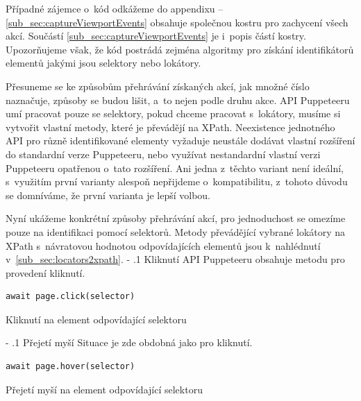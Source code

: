 \documentclass[12pt, a4paper, twoside]{article}
\makeatletter
\newcommand{\codefigureSpacing}{1.2}
\renewcommand\paragraph{%
	\@startsection{subparagraph}{5}{0mm}%
	{-\baselineskip}%
	{.1\baselineskip}%
	{\normalfont\normalsize\bfseries}}
\makeatother
\begin{document}
	Případné zájemce o~kód odkážeme do appendixu -- \ref{sub_sec:captureViewportEvents} obsahuje společnou kostru pro zachycení všech akcí. Součástí \ref{sub_sec:captureViewportEvents} je i~popis částí kostry. Upozorňujeme však, že kód postrádá zejména algoritmy pro získání identifikátorů elementů jakými jsou selektory nebo lokátory.
	
	\newpage
	Přesuneme se ke způsobům přehrávání získaných akcí, jak množné číslo naznačuje, způsoby se budou lišit, a~to nejen podle druhu akce. API Puppeteeru umí pracovat pouze se selektory, pokud chceme pracovat s~lokátory, musíme si vytvořit vlastní metody, které je převádějí na XPath. Neexistence jednotného API pro různě identifikované elementy vyžaduje neustále dodávat vlastní rozšíření do standardní verze Puppeteeru, nebo využívat nestandardní vlastní verzi Puppeteeru opatřenou o~tato rozšíření. Ani jedna z~těchto variant není ideální, s~využitím první varianty alespoň nepřijdeme o~kompatibilitu, z~tohoto důvodu se domníváme, že první varianta je lepší volbou.

	Nyní ukážeme konkrétní způsoby přehrávání akcí, pro jednoduchost se omezíme pouze na identifikaci pomocí selektorů. Metody převádějící vybrané lokátory na XPath s~návratovou hodnotou odpovídajících elementů jsou k~nahlédnutí v~\ref{sub_sec:locators2xpath}.
	\paragraph{Kliknutí}
	API Puppeteeru obsahuje metodu pro provedení kliknutí.
	\nopagebreak
	\begin{codefigure}[H]
		\renewcommand\baselinestretch{\codefigureSpacing}
	\begin{lstlisting}[style=MyJavaScript]
await page.click(selector)
	\end{lstlisting}
	\caption{Kliknutí na element odpovídající selektoru}
	\end{codefigure}
	\paragraph{Přejetí myší}
	Situace je zde obdobná jako pro kliknutí.
	\nopagebreak
	\begin{codefigure}[H]
		\renewcommand\baselinestretch{\codefigureSpacing}
	\begin{lstlisting}[style=MyJavaScript]
await page.hover(selector)
	\end{lstlisting}
	\caption{Přejetí myší na element odpovídající selektoru}
	\end{codefigure}	
\end{document}
